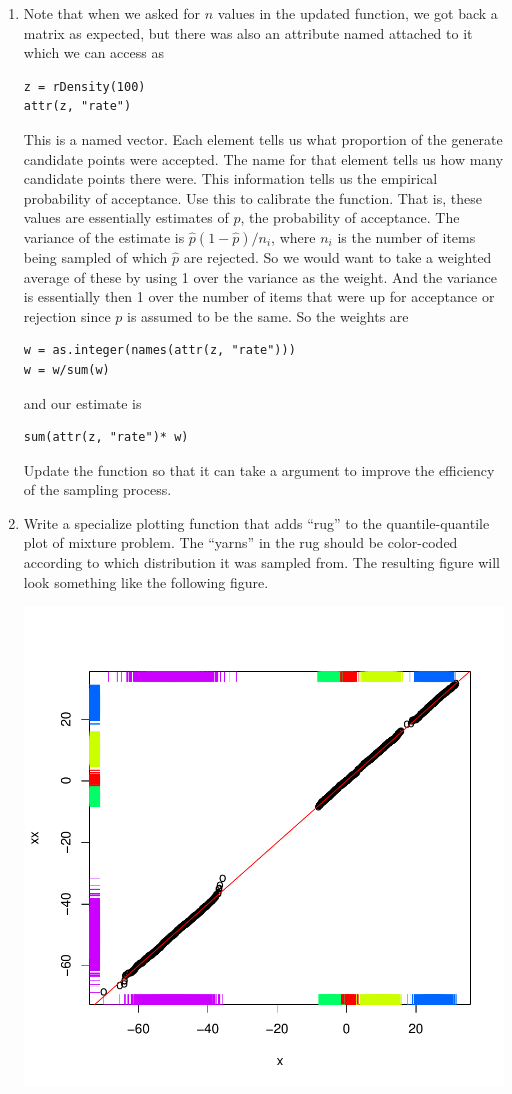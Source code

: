 \begin{enumerate}
\item Note that when we asked for $n$ values in the updated
   function, we got back 
a matrix as expected, but there was also an attribute
named  attached to it which we can access
as 
\begin{verbatim}
z = rDensity(100)
attr(z, "rate")
\end{verbatim}
This is a named vector.  Each element tells us what proportion of the
generate candidate points were accepted.  The name for that element
tells us how many candidate points there were.  This information tells
us the empirical probability of acceptance.  Use this to calibrate the
function.  That is, these values are essentially estimates of $p$, the
probability of acceptance.  The variance of the estimate is $ \hat{p}
(1 - \hat{p})/n_i$, where $n_i$ is the number of items being sampled
of which $\hat{p}$ are rejected.  So we would want to take a weighted
average of these by using 1 over the variance as the weight.  And the
variance is essentially then 1 over the number of items that were up
for acceptance or rejection since $p$ is assumed to be the same.  So
the weights are
\begin{verbatim}
w = as.integer(names(attr(z, "rate")))
w = w/sum(w)
\end{verbatim}
and our estimate is 
\begin{verbatim}
sum(attr(z, "rate")* w)
\end{verbatim}

Update the function so that it can take a  argument to
improve the efficiency of the sampling process.

\item 
Write a specialize plotting function that adds ``rug'' to the
  quantile-quantile plot of mixture problem. The ``yarns'' in the rug
  should be color-coded according to which distribution it was sampled
  from.  The resulting figure will look something like the following figure.

\includegraphics{RNG/images/QQEqualCount.pdf}   


\end{enumerate}

